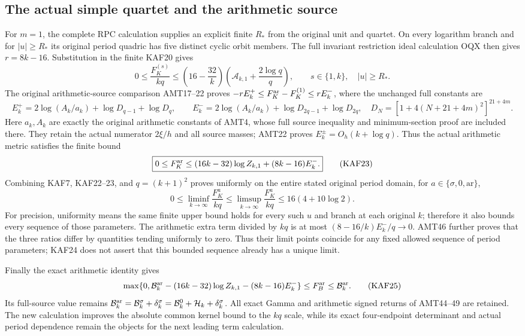 \documentclass[11pt,a4paper]{article}
\begin{document}
\subsection{The actual simple quartet and the arithmetic source}
For $m=1$, the complete RPC calculation supplies an explicit finite
$R_*$ from the original unit and quartet. On every logarithm branch
and for $|u|\ge R_*$ its original period quadric has five distinct
cyclic orbit members. The full invariant restriction ideal calculation
OQX then gives $r=8k-16$. Substitution in the finite KAF20 gives
\[
 \boxed{0\le\frac{F_K^{(s)}}{kq}
 \le\left(16-\frac{32}{k}\right)
       \left(\mathcal A_{k,1}+\frac{2\log q}{q}\right),
 \qquad s\in\{1,k\},\quad |u|\ge R_*.}\tag{KAF22}
\]
The original arithmetic-source comparison AMT17--22 proves
$-rE_k^+\le F_K^{\rm ar}-F_K^{(1)}\le rE_k^-$, where the
unchanged full constants are
\[
 E_k^+=2\log(A_k/a_k)+\log D_{q-1}+\log D_q,\qquad
 E_k^-=2\log(A_k/a_k)+\log D_{2q-1}+\log D_{2q},
 \quad D_N=[1+4(N+21+4m)^2]^{21+4m}.
\]
Here $a_k,A_k$ are exactly the original arithmetic constants of AMT4,
whose full source inequality and minimum-section proof are included
there. They retain the actual numerator $2\xi/h$ and all source
masses; AMT22 proves $E_k^\pm=O_h(k+\log q)$.
Thus the actual arithmetic metric satisfies the finite bound
\[
 \boxed{0\le F_K^{\rm ar}
       \le(16k-32)\log Z_{k,1}+(8k-16)E_k^-.}\tag{KAF23}
\]
Combining KAF7, KAF22--23, and $q=(k+1)^2$ proves uniformly on
the entire stated original period domain, for
$a\in\{\sigma,0,\mathrm{ar}\}$,
\[
 \boxed{0\le\liminf_{k\to\infty}\frac{F_K^a}{kq}
       \le\limsup_{k\to\infty}\frac{F_K^a}{kq}
       \le16(4+10\log2).}\tag{KAF24}
\]
For precision, uniformity means the same finite upper bound holds for
every such $u$ and branch at each original $k$; therefore it also
bounds every sequence of those parameters. The arithmetic extra term
divided by $kq$ is at most $(8-16/k)E_k^-/q\to0$.
AMT46 further proves that the three ratios differ by quantities
tending uniformly to zero. Thus their limit points coincide for any
fixed allowed sequence of period parameters; KAF24 does not assert
that this bounded sequence already has a unique limit.

Finally the exact arithmetic identity gives
\[
 \max\{0,\mathcal B_k^{\rm ar}-(16k-32)\log Z_{k,1}
                              -(8k-16)E_k^-\}
       \le F_B^{\rm ar}\le\mathcal B_k^{\rm ar}.\tag{KAF25}
\]
Its full-source value remains
$\mathcal B_k^{\rm ar}=\mathcal B_k^\sigma+\delta_k^\sigma
=\mathcal B_k^0+\mathcal H_k+\delta_k^\sigma$.
All exact Gamma and arithmetic signed returns of AMT44--49 are
retained. The new calculation improves the absolute common kernel
bound to the $kq$ scale, while its exact four-endpoint determinant
and actual period dependence remain the objects for the next leading
term calculation.
\end{document}
